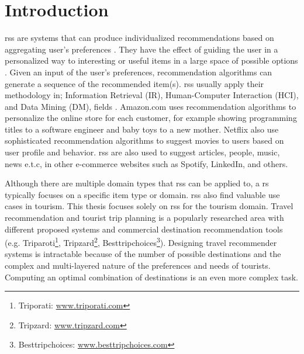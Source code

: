 

\chapter{Introduction}\label{chapter:introduction}
\Glspl{rs} are systems that can produce individualized recommendations based on aggregating user's preferences \parencite{Ricci2011IntroductionHandbook}. They have the effect of guiding the user in a personalized way to interesting
or useful items in a large space of possible options \parencite{Burke2002HybridInteraction}. Given an input of the user's preferences, recommendation algorithms can generate a sequence of the recommended item(s).  \Glspl{rs} usually
apply their methodology in; Information Retrieval (IR), Human-Computer Interaction (HCI), and Data Mining (DM), fields \parencite{Ricci2011IntroductionHandbook}. Amazon.com \parencite{Linden2003Amazon.comFiltering} uses recommendation algorithms to personalize the online store for each customer, for example showing programming titles to a software engineer and baby toys to a new mother.  Netflix \parencite{Amatriain2013BigRecommendations} also use sophisticated recommendation algorithms to suggest movies to users based on user profile and behavior. \Glspl{rs} are also used to suggest articles, people, music, news e.t.c, in other e-commerce websites such as Spotify, LinkedIn, and others.

Although there are multiple domain types that \glspl{rs} can be applied to, a \gls{rs} typically focuses on a specific item type or domain. \Glspl{rs} also find valuable use cases in tourism. This thesis focuses solely on \glspl{rs} for the tourism domain. Travel recommendation and tourist trip planning is a popularly researched area with different proposed systems \parencite{wolfgang_umap_recsystem, cbrecsys2014, Thiengburanathum2018AnTourists, Arif2020Blockchain-BasedSystem, Alrasheed2020ASystem} and commercial destination recommendation tools (e.g. Triparoti\footnote{Triporati: \url{www.triporati.com}}, Tripzard\footnote{Tripzard: \url{www.tripzard.com}}, Besttripchoices\footnote{Besttripchoices: \url{www.besttripchoices.com}}).
Designing travel recommender systems is intractable because of the number of possible destinations and the complex
and multi-layered nature of the preferences and needs of tourists. Computing an optimal combination of destinations is an even more complex task. 

